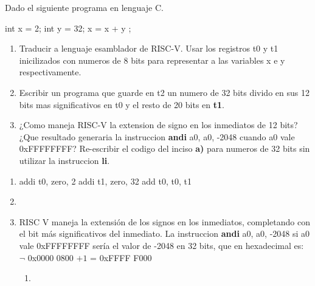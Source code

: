 \begin{enunciado}{\ejercicio}
    Dado el siguiente programa en lenguaje C.

    \begin{center}
    \begin{cLang}[linewidth=6cm]
    int x = 2;
    int y = 32;
    x = x + y ;
    \end{cLang}
\end{center}
    
    \begin{enumerate}
        \item Traducir a lenguaje esamblador de RISC-V. Usar los registros t0 y t1 inicilizados con
numeros de 8 bits para representar a las variables x e y respectivamente.
        \item  Escribir un programa que guarde en t2 un numero de 32 bits divido en sus 12 bits mas
        significativos en t0 y el resto de 20 bits en \textbf{t1}.
        \item ¿Como maneja RISC-V la extension de signo en los inmediatos de 12 bits? ¿Que resultado 
        generaria la instruccion  \textbf{andi} a0, a0, -2048 cuando a0 vale 0xFFFFFFFF? Re-escribir
        el codigo del inciso  \textbf{a)} para numeros de 32 bits sin utilizar la instruccion  \textbf{li}.
    \end{enumerate}
    \end{enunciado}

    \begin{enumerate}
        \item 
        \begin{riscv}
    addi t0, zero, 2
    addi t1, zero, 32
    add t0, t0, t1
        \end{riscv}
        \item \hacer
        \item RISC V maneja la extensión de los signos en los inmediatos, completando con el bit más significativos
        del inmediato. 
        La instruccion \textbf{andi} a0, a0, -2048 si a0 vale 0xFFFFFFFF sería el valor de -2048 en 32 bits, que  en 
        hexadecimal es:  $\neg$ 0x0000 0800 $+ 1$ = 0xFFFF F000 

        \begin{enumerate}
            \item \hacer
        \end{enumerate}
    \end{enumerate}
    